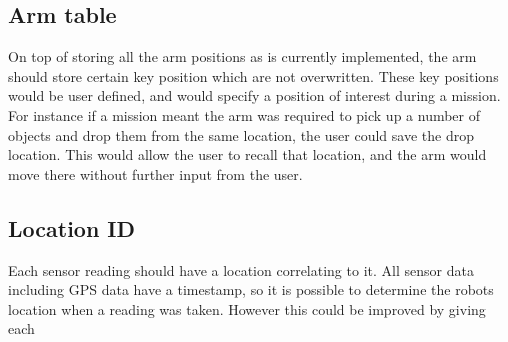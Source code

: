 \subsection{Arm table}
On top of storing all the arm positions as is currently implemented, the arm should store certain key position which are not overwritten. These key positions would be user defined, and would specify a position of interest during a mission. For instance if a mission meant the arm was required to pick up a number of objects and drop them from the same location, the user could save the drop location. This would allow the user to recall that location, and the arm would move there without further input from the user.

\subsection{Location ID}
Each sensor reading should have a location correlating to it. All sensor data including GPS data have a timestamp, so it is possible to determine the robots location when a reading was taken. However this could be improved by giving each 





